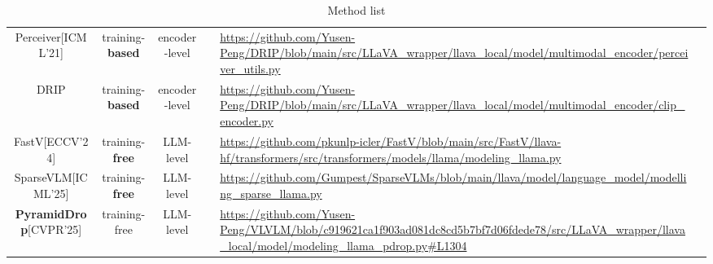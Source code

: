 \documentclass[11pt]{article}
\newcommand{\cmark}{\ding{51}}
\begin{document}
\begin{table}[ht]
{\begin{tabular}{ccccp{8cm}c}
        \cellcolor{green!10}Perceiver[ICML'21] & training-\textbf{based} & encoder-level & \cmark & \url{https://github.com/Yusen-Peng/DRIP/blob/main/src/LLaVA_wrapper/llava_local/model/multimodal_encoder/perceiver_utils.py} & \cmark \\
        \cellcolor{green!10}DRIP & training-\textbf{based} & encoder-level & \cmark & \url{https://github.com/Yusen-Peng/DRIP/blob/main/src/LLaVA_wrapper/llava_local/model/multimodal_encoder/clip_encoder.py} & \cmark \\
        \cellcolor{green!10}FastV[ECCV'24] & training-\textbf{free} & LLM-level & \cmark & \url{https://github.com/pkunlp-icler/FastV/blob/main/src/FastV/llava-hf/transformers/src/transformers/models/llama/modeling_llama.py} & \cmark \\
        \cellcolor{green!10}SparseVLM[ICML'25] & training-\textbf{free} & LLM-level & \cmark & \url{https://github.com/Gumpest/SparseVLMs/blob/main/llava/model/language_model/modelling_sparse_llama.py} & \\
        \cellcolor{green!10}\textbf{PyramidDrop}[CVPR'25] & training-free & LLM-level & \cmark & \url{https://github.com/Yusen-Peng/VLVLM/blob/c919621ca1f903ad081dc8cd5b7bf7d06fdede78/src/LLaVA_wrapper/llava_local/model/modeling_llama_pdrop.py#L1304} & \cmark \\
        \bottomrule
    \end{tabular}}
    \caption{Method list}
    \label{tab:methods}
\end{table}
\end{document}
